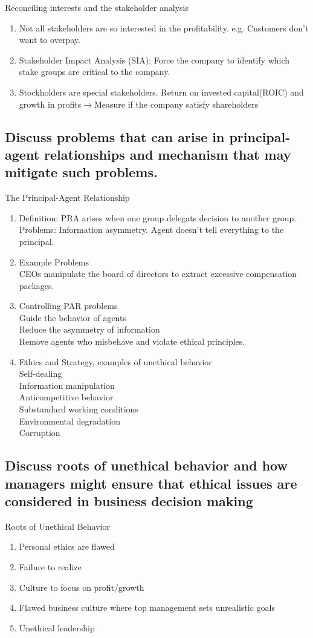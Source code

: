 \documentclass{article}
\newcommand{\be}{\begin{enumerate}}
\newcommand{\ee}{\end{enumerate}}
\newcommand{\ra}{$\rightarrow$}
\begin{document}
Reconciling interests and the stakeholder analysis
\be
    \item Not all stakeholders are so interested in the profitability. e.g. Customers
        don't want to overpay. 
    \item Stakeholder Impact Analysis (SIA): Force the company to identify
        which stake groups are critical to the company.
    \item Stockholders are special stakeholders. Return on invested capital(ROIC)
        and growth in profits\ra Measure if the company satisfy shareholders
\ee

\subsection{Discuss problems that can arise in principal-agent relationships and
mechanism that may mitigate such problems.}
The Principal-Agent Relationship
\be
    \item Definition: PRA arises when one group delegats decision to another group.
    Problems: Information asymmetry. Agent doesn't tell everything to the principal.
    \item Example Problems
        \\ CEOs manipulate the board of directors to extract excessive compensation packages.
    \item Controlling PAR problems
        \\ Guide the behavior of agents
        \\ Reduce the asymmetry of information
        \\ Remove agents who misbehave and violate ethical principles.
    \item Ethics and Strategy, examples of unethical behavior
        \\Self-dealing
        \\Information manipulation
        \\Anticompetitive behavior
        \\Substandard working conditions
        \\Environmental degradation
        \\Corruption
\ee
\subsection{Discuss roots of unethical behavior and how managers might ensure that ethical issues
are considered in business decision making}
Roots of Unethical Behavior
\be
    \item Personal ethics are flawed
    \item Failure to realize
    \item Culture to focus on profit/growth
    \item Flawed business culture where top management sets unrealistic goals
    \item Unethical leadership
\ee
\end{document}
